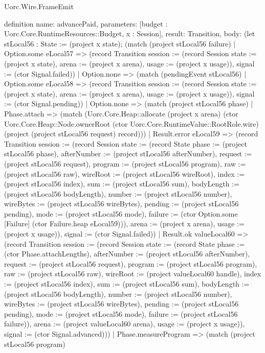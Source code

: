 \begin{lexlean}{Uorc.Wire.FrameEmit}
\begin{semanticmodule}
definition{
  name: advancePaid,
  parameters: [budget : Uorc.Core.RuntimeResources::Budget, x : Session],
  result: Transition,
  body: (let stLocal56 : State := (project x state); (match (project stLocal56 failure)
    | Option.some eLocal57 => (record Transition {session := (record Session {state := (project x state), arena := (project x arena), usage := (project x usage)}), signal := (ctor Signal.failed)})
    | Option.none => (match (pendingEvent stLocal56)
      | Option.some eLocal58 => (record Transition {session := (record Session {state := (project x state), arena := (project x arena), usage := (project x usage)}), signal := (ctor Signal.pending)})
      | Option.none => (match (project stLocal56 phase)
        | Phase.attach => (match (Uorc.Core.Heap::allocate (project x arena) (ctor Uorc.Core.Heap::Node.ownerRoot (ctor Uorc.Core.RuntimeValue::RootRole.wire) (project (project stLocal56 request) record)))
          | Result.error eLocal59 => (record Transition {session := (record Session {state := (record State {phase := (project stLocal56 phase), afterNumber := (project stLocal56 afterNumber), request := (project stLocal56 request), program := (project stLocal56 program), raw := (project stLocal56 raw), wireRoot := (project stLocal56 wireRoot), index := (project stLocal56 index), sum := (project stLocal56 sum), bodyLength := (project stLocal56 bodyLength), number := (project stLocal56 number), wireBytes := (project stLocal56 wireBytes), pending := (project stLocal56 pending), mode := (project stLocal56 mode), failure := (ctor Option.some [Failure] (ctor Failure.heap eLocal59))}), arena := (project x arena), usage := (project x usage)}), signal := (ctor Signal.failed)})
          | Result.ok valueLocal60 => (record Transition {session := (record Session {state := (record State {phase := (ctor Phase.attachLengths), afterNumber := (project stLocal56 afterNumber), request := (project stLocal56 request), program := (project stLocal56 program), raw := (project stLocal56 raw), wireRoot := (project valueLocal60 handle), index := (project stLocal56 index), sum := (project stLocal56 sum), bodyLength := (project stLocal56 bodyLength), number := (project stLocal56 number), wireBytes := (project stLocal56 wireBytes), pending := (project stLocal56 pending), mode := (project stLocal56 mode), failure := (project stLocal56 failure)}), arena := (project valueLocal60 arena), usage := (project x usage)}), signal := (ctor Signal.advanced)}))
        | Phase.measureProgram => (match (project stLocal56 program)
}
\end{semanticmodule}
\end{lexlean}
